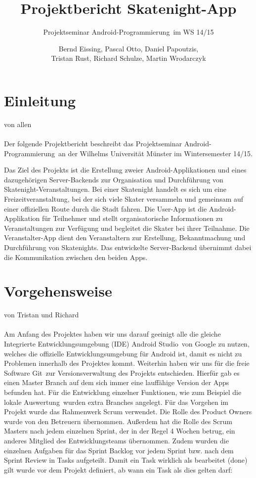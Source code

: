 \documentclass[a4paper, titlepage]{scrartcl}
\title{Projektbericht Skatenight-App}
\subtitle{Projektseminar \glqq Android-Programmierung\grqq\ im WS 14/15}
\author{Bernd Eissing, Pascal Otto, Daniel Papoutzis,\\Tristan Rust, Richard Schulze, Martin Wrodarczyk}
\date{}
\newcommand{\AUTHOR}[1]{
	von #1 \\ \\
}
\begin{document}
\maketitle

\tableofcontents
\newpage

\section{Einleitung}
\AUTHOR{allen}
Der folgende Projektbericht beschreibt das Projektseminar \glqq Android-Programmierung\grqq\ an der Wilhelms Universität Münster im Wintersemester 14/15.

Das Ziel des Projekts ist die Erstellung zweier Android-Applikationen und eines dazugehörigen Server-Backends zur Organisation und Durchführung von Skatenight-Veranstal\-tun\-gen. Bei einer Skatenight handelt es sich um eine Freizeitveranstaltung, bei der sich viele Skater versammeln und gemeinsam auf einer offiziellen Route durch die Stadt fahren. Die User-App ist die Android-Applikation für Teilnehmer und stellt organisatorische Informationen zu Veranstaltungen zur Verfügung und begleitet die Skater bei ihrer Teilnahme. Die Veranstalter-App dient den Veranstaltern zur Erstellung, Bekanntmachung und Durchführung von Skatenights. Das entwickelte Server-Backend übernimmt dabei die Kommunikation zwischen den beiden Apps.

\section{Vorgehensweise}
\AUTHOR{Tristan und Richard}
Am Anfang des Projektes haben wir uns darauf geeinigt alle die gleiche Integrierte Entwicklungsumgebung (IDE) \glqq Android Studio\grqq\ von Google zu nutzen, welches die offizielle Entwicklungsumgebung für Android ist, damit es nicht zu Problemen innerhalb des Projektes kommt.
Weiterhin haben wir uns für die freie Software \glqq Git\grqq\ zur Versionsverwaltung des Projekts entschieden. Hierfür gab es einen Master Branch auf dem sich immer eine lauffähige Version der Apps befunden hat. Für die Entwicklung einzelner Funktionen, wie zum Beispiel die \glqq lokale Auswertung\grqq\ wurden extra Branches angelegt.
Für das Vorgehen im Projekt wurde das Rahmenwerk Scrum verwendet. Die Rolle des Product Owners wurde von den Betreuern übernommen. Außerdem hat die Rolle des Scrum Masters nach jedem einzelnen Sprint, der in der Regel 4 Wochen betrug, ein anderes Mitglied des Entwicklungsteams übernommen. Zudem wurden die einzelnen Aufgaben für das Sprint Backlog vor jedem Sprint bzw. nach dem Sprint Review in Tasks aufgeteilt. Damit ein Task wirklich als bearbeitet (\glqq done\grqq) gilt wurde vor dem Projekt definiert, ab wann ein Task als dies gelten darf:
\end{document}
